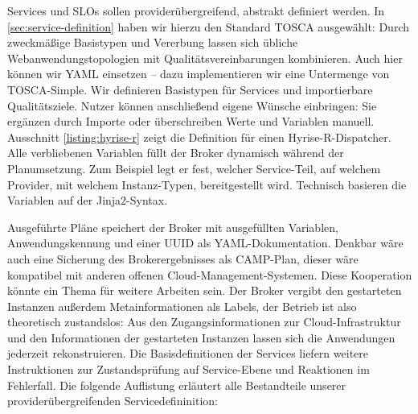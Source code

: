 Services und SLOs sollen providerübergreifend, abstrakt definiert werden. In \autoref{sec:service-definition} haben wir hierzu den Standard TOSCA ausgewählt: Durch zweckmäßige Basistypen und Vererbung lassen sich übliche Webanwendungstopologien mit Qualitätsvereinbarungen kombinieren. Auch hier können wir YAML einsetzen -- dazu implementieren wir eine Untermenge von TOSCA-Simple. Wir definieren Basistypen für Services und importierbare Qualitätsziele. Nutzer können anschließend eigene Wünsche einbringen: Sie ergänzen durch Importe oder überschreiben Werte und Variablen manuell. Ausschnitt \autoref{listing:hyrise-r} zeigt die Definition für einen Hyrise-R-Dispatcher. Alle verbliebenen Variablen füllt der Broker dynamisch während der Planumsetzung. Zum Beispiel legt er fest, welcher Service-Teil, auf welchem Provider, mit welchem Instanz-Typen, bereitgestellt wird. Technisch basieren die Variablen auf der Jinja2-Syntax. 

Ausgeführte Pläne speichert der Broker mit ausgefüllten Variablen, Anwendungskennung und einer UUID als YAML-Dokumentation. Denkbar wäre auch eine Sicherung des Brokerergebnisses als CAMP-Plan, dieser wäre kompatibel mit anderen offenen Cloud-Management-Systemen. Diese Kooperation könnte ein Thema für weitere Arbeiten sein. Der Broker vergibt den gestarteten Instanzen außerdem Metainformationen als Labels, der Betrieb ist also theoretisch zustandslos: Aus den Zugangsinformationen zur Cloud-Infrastruktur und den Informationen der gestarteten Instanzen lassen sich die Anwendungen jederzeit rekonstruieren. Die Basisdefinitionen der Services liefern weitere Instruktionen zur Zustandsprüfung auf Service-Ebene und Reaktionen im Fehlerfall. Die folgende Auflistung erläutert alle Bestandteile unserer providerübergreifenden Servicedefininition:


